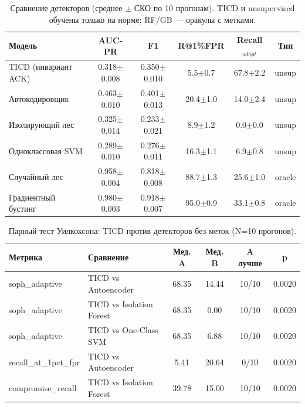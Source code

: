 \begin{table}[htbp]
\centering
\caption{Сравнение детекторов (среднее $\pm$ СКО по 10 прогонам). TICD и unsupervised обучены только на норме; RF/GB — оракулы с метками.}
\label{tab:ticd_comparison}
\begin{tabular}{lccccc}
\hline
Модель & AUC-PR & F1 & R@1\%FPR & Recall$_{adapt}$ & Тип \\
\hline
TICD (инвариант ACK) & 0.318$\pm$0.008 & 0.350$\pm$0.010 & 5.5$\pm$0.7 & 67.8$\pm$2.2 & unsup \\
Автокодировщик & 0.463$\pm$0.010 & 0.401$\pm$0.013 & 20.4$\pm$1.0 & 14.0$\pm$2.4 & unsup \\
Изолирующий лес & 0.325$\pm$0.014 & 0.233$\pm$0.021 & 8.9$\pm$1.2 & 0.0$\pm$0.0 & unsup \\
Одноклассовая SVM & 0.289$\pm$0.010 & 0.276$\pm$0.011 & 16.3$\pm$1.1 & 6.9$\pm$0.8 & unsup \\
Случайный лес & 0.958$\pm$0.004 & 0.818$\pm$0.008 & 88.7$\pm$1.3 & 25.6$\pm$1.0 & oracle \\
Градиентный бустинг & 0.980$\pm$0.003 & 0.918$\pm$0.007 & 95.0$\pm$0.9 & 33.1$\pm$0.8 & oracle \\
\hline
\end{tabular}
\end{table}

\begin{table}[htbp]
\centering
\caption{Парный тест Уилкоксона: TICD против детекторов без меток (N=10 прогонов).}
\label{tab:ticd_wilcoxon}
\begin{tabular}{llcccc}
\hline
Метрика & Сравнение & Мед. A & Мед. B & A лучше & p \\
\hline
soph_adaptive & TICD vs Autoencoder & 68.35 & 14.44 & 10/10 & 0.0020 \\
soph_adaptive & TICD vs Isolation Forest & 68.35 & 0.00 & 10/10 & 0.0020 \\
soph_adaptive & TICD vs One-Class SVM & 68.35 & 6.88 & 10/10 & 0.0020 \\
recall_at_1pct_fpr & TICD vs Autoencoder & 5.41 & 20.64 & 0/10 & 0.0020 \\
compromise_recall & TICD vs Isolation Forest & 39.78 & 15.00 & 10/10 & 0.0020 \\
\hline
\end{tabular}
\end{table}